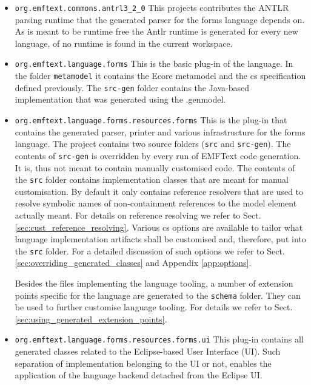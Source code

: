 	\begin{itemize} 
	  \item \texttt{org.emftext.commons.antrl3\_2\_0} This projects contributes the
	  ANTLR parsing runtime that the generated parser for the forms language
	  depends on. As \EMFText is meant to be runtime free the Antlr runtime is generated
	  for every new language, of no runtime is found in the current workspace.
	  \item \texttt{org.emftext.language.forms} This is the basic plug-in of the
	  language. In the folder \texttt{metamodel} it contains the Ecore metamodel
	  and the cs specification defined previously. The \texttt{src-gen} folder contains the Java-based implementation that was
	  generated using the .genmodel.
	  \item \texttt{org.emftext.language.forms.resources.forms}
	  This is the plug-in that contains the generated parser, printer and various
	  infrastructure for the forms language. The project contains two source
	  folders (\texttt{src} and \texttt{src-gen}). The contents of \texttt{src-gen}
	  is overridden by every run of EMFText code generation. It is, thus not meant
	  to contain manually customised code. The contents of the \texttt{src} folder
	  contains implementation classes that are meant for manual customisation. By
	  default it only contains reference resolvers that are used to resolve
	  symbolic names of non-containment references to the model element actually
	  meant. For details on reference resolving we refer to Sect.
	  \ref{sec:cust_reference_resolving}. Various cs options are available to
	  tailor what language implementation artifacts shall be customised and, therefore, 
	  put into the \texttt{src} folder. For a
	  detailed discussion of such options we refer to Sect. \ref{sec:overriding_generated_classes} and
	  Appendix \ref{app:options}.
	  
	  Besides the files implementing the language tooling, a number of extension
	  points specific for the language are generated to the \texttt{schema} folder. 
	  They can be used to further customise language tooling. For details we refer
	  to Sect. \ref{sec:using_generated_extension_points}.
	  
	  \item \texttt{org.emftext.language.forms.resources.forms.ui} This plug-in 
	  contains all generated classes related to the Eclipse-based User Interface
	  (UI). Such separation of implementation belonging to the UI or not, enables
	  the application of the language backend detached from the Eclipse UI.
	\end{itemize}
	
